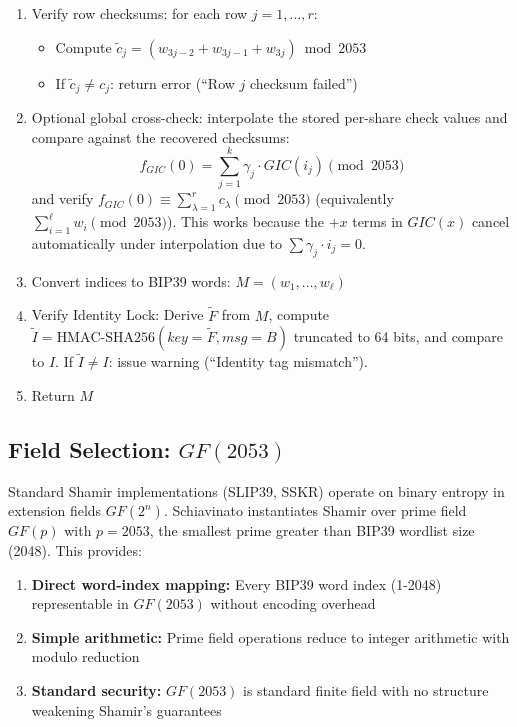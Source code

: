 \documentclass[11pt]{article}
\begin{document}
\begin{enumerate}[noitemsep]
    \begin{itemize}[noitemsep]
        \item Extract share values: $y_s^{(i_1)}, \ldots, y_s^{(i_k)}$ from shares
        \item Interpolate: $s = \sum_{j=1}^k \gamma_j \cdot y_s^{(i_j)} \pmod{2053}$
    \end{itemize}
    \item Verify row checksums: for each row $j = 1, \ldots, r$:
    \begin{itemize}[noitemsep]
        \item Compute $\tilde{c}_j = (w_{3j-2} + w_{3j-1} + w_{3j}) \bmod 2053$
        \item If $\tilde{c}_j \neq c_j$: return error (``Row $j$ checksum failed'')
    \end{itemize}
    \item Optional global cross-check: interpolate the stored per-share check values and compare against the recovered checksums:
    \[
        f_{GIC}(0) = \sum_{j=1}^{k} \gamma_j \cdot GIC(i_j) \pmod{2053}
    \]
    and verify $f_{GIC}(0) \equiv \sum_{\lambda=1}^{r} c_\lambda \pmod{2053}$ (equivalently $\sum_{i=1}^{\ell} w_i \pmod{2053}$). This works because the $+x$ terms in $GIC(x)$ cancel automatically under interpolation due to $\sum \gamma_j \cdot i_j = 0$.
    \item Convert indices to BIP39 words: $M = (w_1, \ldots, w_\ell)$
    \item Verify Identity Lock: Derive $\tilde{F}$ from $M$, compute $\tilde{I} = \text{HMAC-SHA256}(key=\tilde{F}, msg=B)$ truncated to 64 bits, and compare to $I$. If $\tilde{I} \neq I$: issue warning (``Identity tag mismatch'').
    \item Return $M$
\end{enumerate}

\subsection{\texorpdfstring{Field Selection: $GF(2053)$}{Field Selection: GF(2053)}}

Standard Shamir implementations (SLIP39, SSKR) operate on binary entropy in extension fields $GF(2^n)$. Schiavinato instantiates Shamir over prime field $GF(p)$ with $p = 2053$, the smallest prime greater than BIP39 wordlist size (2048). This provides:

\begin{enumerate}[noitemsep]
    \item \textbf{Direct word-index mapping:} Every BIP39 word index (1-2048) representable in $GF(2053)$ without encoding overhead
    \item \textbf{Simple arithmetic:} Prime field operations reduce to integer arithmetic with modulo reduction
    \item \textbf{Standard security:} $GF(2053)$ is standard finite field with no structure weakening Shamir's guarantees
\end{enumerate}
\end{document}
